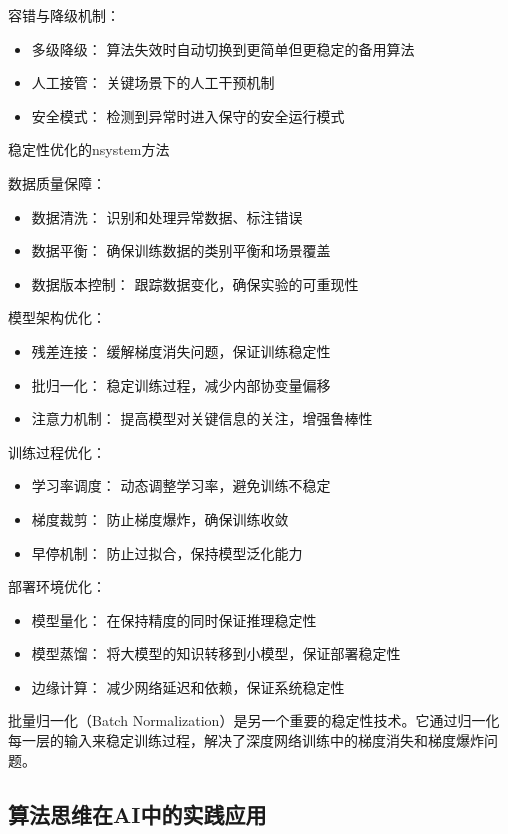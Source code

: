 容错与降级机制：
\begin{itemize}
\item 多级降级： 算法失效时自动切换到更简单但更稳定的备用算法
\item 人工接管： 关键场景下的人工干预机制
\item 安全模式： 检测到异常时进入保守的安全运行模式
\end{itemize}

稳定性优化的nsystem方法

数据质量保障：
\begin{itemize}
\item 数据清洗： 识别和处理异常数据、标注错误
\item 数据平衡： 确保训练数据的类别平衡和场景覆盖
\item 数据版本控制： 跟踪数据变化，确保实验的可重现性
\end{itemize}

模型架构优化：
\begin{itemize}
\item 残差连接： 缓解梯度消失问题，保证训练稳定性
\item 批归一化： 稳定训练过程，减少内部协变量偏移
\item 注意力机制： 提高模型对关键信息的关注，增强鲁棒性
\end{itemize}

训练过程优化：
\begin{itemize}
\item 学习率调度： 动态调整学习率，避免训练不稳定
\item 梯度裁剪： 防止梯度爆炸，确保训练收敛
\item 早停机制： 防止过拟合，保持模型泛化能力
\end{itemize}

部署环境优化：
\begin{itemize}
\item 模型量化： 在保持精度的同时保证推理稳定性
\item 模型蒸馏： 将大模型的知识转移到小模型，保证部署稳定性
\item 边缘计算： 减少网络延迟和依赖，保证系统稳定性
\end{itemize}

批量归一化（Batch Normalization）是另一个重要的稳定性技术。它通过归一化每一层的输入来稳定训练过程，解决了深度网络训练中的梯度消失和梯度爆炸问题。

\subsection{算法思维在AI中的实践应用}

